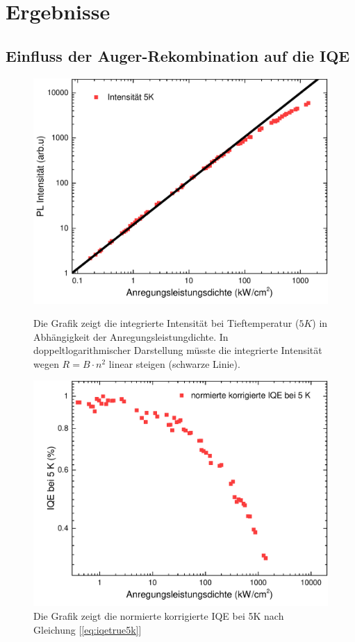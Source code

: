 \chapter{Ergebnisse}
\section{Einfluss der Auger-Rekombination auf die IQE}
\thispagestyle{fancy}
%
\begin{figure}[ht]
    \centering
    \begin{minipage}[t]{0.49\linewidth}
        \centering
        \includegraphics[width=\linewidth]{Bilder/AugerBei5K.pdf}
        \caption{Die Grafik zeigt die integrierte Intensität bei Tieftemperatur ($5 K$) in Abhängigkeit der Anregungsleistungdichte. In doppeltlogarithmischer Darstellung müsste die integrierte Intensität wegen $R = B \cdot n^2$ linear steigen (schwarze Linie).}
        \label{fig:auger5k}
    \end{minipage}%
    \hfill
    \begin{minipage}[t]{0.49\linewidth}
        \centering
        \includegraphics[width=\linewidth]{Bilder/NormierteKorrgierteIQE5K.pdf}
        \caption{Die Grafik zeigt die normierte korrigierte IQE bei 5K nach Gleichung [\ref{eq:iqetrue5k}] }
        \label{fig:trueiqe}
    \end{minipage}
\end{figure}
